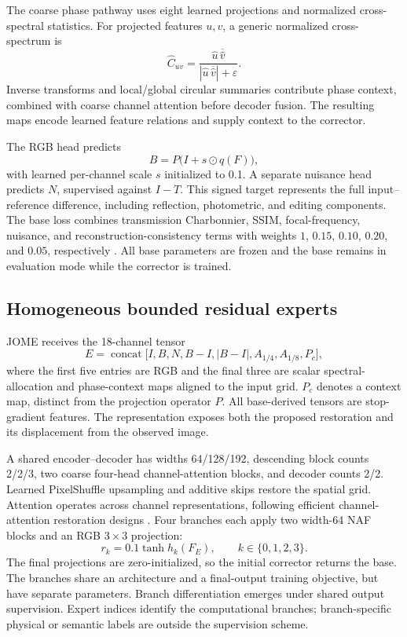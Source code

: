 \documentclass[12pt]{article}
\begin{document}
The coarse phase pathway uses eight learned projections and normalized cross-spectral statistics. For projected features $u,v$, a generic normalized cross-spectrum is
\begin{equation}
\widehat C_{uv}=
\frac{\widehat u\,\overline{\widehat v}}
{|\widehat u\,\overline{\widehat v}|+\varepsilon}.
\end{equation}
Inverse transforms and local/global circular summaries contribute phase context, combined with coarse channel attention before decoder fusion. The resulting maps encode learned feature relations and supply context to the corrector.

The RGB head predicts
\begin{equation}
B=P\bigl(I+s\odot q(F)\bigr),
\end{equation}
with learned per-channel scale $s$ initialized to 0.1. A separate nuisance head predicts $N$, supervised against $I-T$. This signed target represents the full input--reference difference, including reflection, photometric, and editing components. The base loss combines transmission Charbonnier, SSIM, focal-frequency, nuisance, and reconstruction-consistency terms with weights $1$, $0.15$, $0.10$, $0.20$, and $0.05$, respectively \citep{wang2004ssim,jiang2021focal}. All base parameters are frozen and the base remains in evaluation mode while the corrector is trained.

\subsection{Homogeneous bounded residual experts}
JOME receives the 18-channel tensor
\begin{equation}
E=\operatorname{concat}\bigl[I,B,N,B-I,|B-I|,A_{1/4},A_{1/8},P_c\bigr],
\label{eq:evidence-tensor}
\end{equation}
where the first five entries are RGB and the final three are scalar spectral-allocation and phase-context maps aligned to the input grid. $P_c$ denotes a context map, distinct from the projection operator $P$. All base-derived tensors are stop-gradient features. The representation exposes both the proposed restoration and its displacement from the observed image.

A shared encoder--decoder has widths 64/128/192, descending block counts 2/2/3, two coarse four-head channel-attention blocks, and decoder counts 2/2. Learned PixelShuffle upsampling and additive skips restore the spatial grid. Attention operates across channel representations, following efficient channel-attention restoration designs \citep{zamir2022restormer}. Four branches each apply two width-64 NAF blocks and an RGB $3\times3$ projection:
\begin{equation}
r_k=0.1\tanh h_k(F_E),\qquad k\in\{0,1,2,3\}.
\end{equation}
The final projections are zero-initialized, so the initial corrector returns the base. The branches share an architecture and a final-output training objective, but have separate parameters. Branch differentiation emerges under shared output supervision. Expert indices identify the computational branches; branch-specific physical or semantic labels are outside the supervision scheme.
\end{document}
